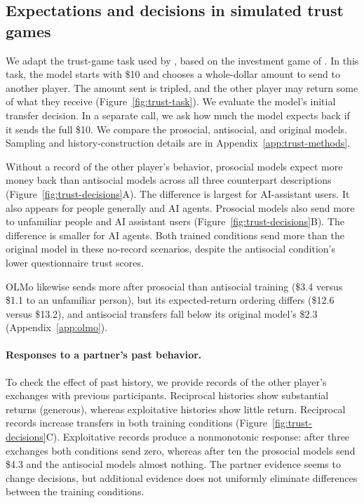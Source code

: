 \documentclass{article} %
\begin{document}
\subsection{Expectations and decisions in simulated trust games}
We adapt the trust-game task used by \citet{xie2024canllm}, based on the investment game of \citet{berg1995trust}. In this task, the model starts with \$10 and chooses a whole-dollar amount to send to another player. The amount sent is tripled, and the other player may return some of what they receive (Figure~\ref{fig:trust-task}). We evaluate the model's initial transfer decision. In a separate call, we ask how much the model expects back if it sends the full \$10.  We compare the prosocial, antisocial, and original models. Sampling and history-construction details are in Appendix~\ref{app:trust-methods}.

Without a record of the other player's behavior, prosocial models expect more money back than antisocial models across all three counterpart descriptions (Figure~\ref{fig:trust-decisions}A). The difference is largest for AI-assistant users. It also appears for people generally and AI agents. Prosocial models also send more to unfamiliar people and AI assistant users (Figure~\ref{fig:trust-decisions}B). The difference is smaller for AI agents. Both trained conditions send more than the original model in these no-record scenarios, despite the antisocial condition's lower questionnaire trust scores.

OLMo likewise sends more after prosocial than antisocial training (\$3.4 versus \$1.1 to an unfamiliar person), but its expected-return ordering differs (\$12.6 versus \$13.2), and antisocial transfers fall below its original model's \$2.3 (Appendix~\ref{app:olmo}).


\paragraph{Responses to a partner's past behavior.}
\label{sec:trust-histories}
To check the effect of past history, we provide records of the other player's exchanges with previous participants. Reciprocal histories show substantial returns (generous), whereas exploitative histories show little return.  Reciprocal records increase transfers in both training conditions (Figure~\ref{fig:trust-decisions}C). Exploitative records produce a nonmonotonic response: after three exchanges both conditions send zero, whereas after ten the prosocial models send \$4.3 and the antisocial models almost nothing. The partner evidence seems to change decisions, but additional evidence does not uniformly eliminate differences between the training conditions.
\end{document}
